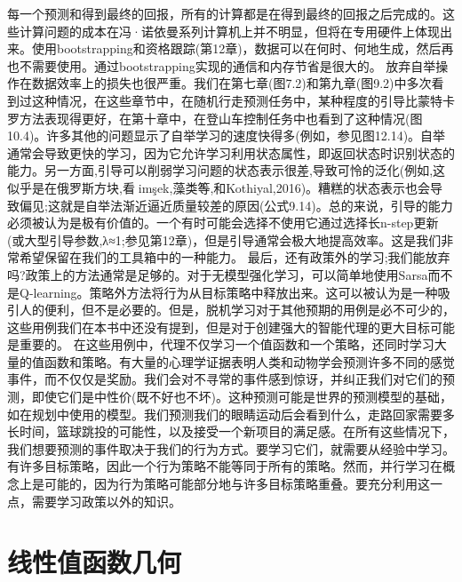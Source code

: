 每一个预测和得到最终的回报，所有的计算都是在得到最终的回报之后完成的。这些计算问题的成本在冯·诺依曼系列计算机上并不明显，但将在专用硬件上体现出来。使用bootstrapping和资格跟踪(第12章)，数据可以在何时、何地生成，然后再也不需要使用。通过bootstrapping实现的通信和内存节省是很大的。
放弃自举操作在数据效率上的损失也很严重。我们在第七章(图7.2)和第九章(图9.2)中多次看到过这种情况，在这些章节中，在随机行走预测任务中，某种程度的引导比蒙特卡罗方法表现得更好，在第十章中，在登山车控制任务中也看到了这种情况(图10.4)。许多其他的问题显示了自举学习的速度快得多(例如，参见图12.14)。自举通常会导致更快的学习，因为它允许学习利用状态属性，即返回状态时识别状态的能力。另一方面,引导可以削弱学习问题的状态表示很差,导致可怜的泛化(例如,这似乎是在俄罗斯方块,看到̧imşek,藻类́等,和Kothiyal,2016)。糟糕的状态表示也会导致偏见;这就是自举法渐近逼近质量较差的原因(公式9.14)。总的来说，引导的能力必须被认为是极有价值的。一个有时可能会选择不使用它通过选择长n-step更新(或大型引导参数,λ≈1;参见第12章)，但是引导通常会极大地提高效率。这是我们非常希望保留在我们的工具箱中的一种能力。
最后，还有政策外的学习;我们能放弃吗?政策上的方法通常是足够的。对于无模型强化学习，可以简单地使用Sarsa而不是Q-learning。策略外方法将行为从目标策略中释放出来。这可以被认为是一种吸引人的便利，但不是必要的。但是，脱机学习对于其他预期的用例是必不可少的，这些用例我们在本书中还没有提到，但是对于创建强大的智能代理的更大目标可能是重要的。
在这些用例中，代理不仅学习一个值函数和一个策略，还同时学习大量的值函数和策略。有大量的心理学证据表明人类和动物学会预测许多不同的感觉事件，而不仅仅是奖励。我们会对不寻常的事件感到惊讶，并纠正我们对它们的预测，即使它们是中性价(既不好也不坏)。这种预测可能是世界的预测模型的基础，如在规划中使用的模型。我们预测我们的眼睛运动后会看到什么，走路回家需要多长时间，篮球跳投的可能性，以及接受一个新项目的满足感。在所有这些情况下，我们想要预测的事件取决于我们的行为方式。要学习它们，就需要从经验中学习。有许多目标策略，因此一个行为策略不能等同于所有的策略。然而，并行学习在概念上是可能的，因为行为策略可能部分地与许多目标策略重叠。要充分利用这一点，需要学习政策以外的知识。

\section{线性值函数几何}

